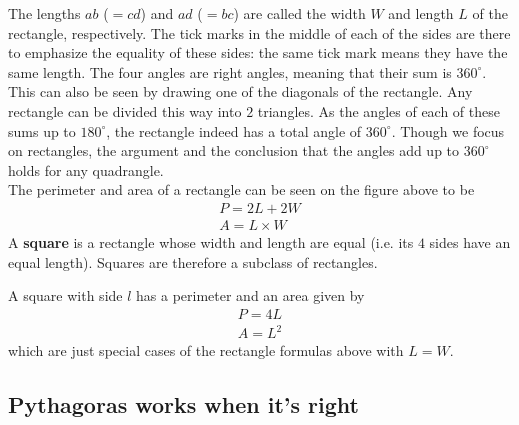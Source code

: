 \noindent The lengths $ab$ ($=cd$) and $ad$ ($=bc$) are called the width $W$ and length $L$ of the rectangle, respectively. The tick marks in the middle of each of the sides are there to emphasize the equality of these sides: the same tick mark means they have the same length. The four angles are right angles, meaning that their sum is $360^{\circ}$. This can also be seen by drawing one of the diagonals of the rectangle. Any rectangle can be divided this way into $2$ triangles. As the angles of each of these sums up to $180^{\circ}$, the rectangle indeed has a total angle of $360^{\circ}$. Though we focus on rectangles, the argument and the conclusion that the angles add up to $360^{\circ}$ holds for any quadrangle.\\

\noindent The perimeter and area of a rectangle can be seen on the figure above to be
\begin{eqnarray*}
P = 2 L + 2 W \\
A = L \times W
\end{eqnarray*}
\noindent A \textbf{square} is a rectangle whose width and length are equal (i.e. its $4$ sides have an equal length). Squares are therefore a subclass of rectangles. 
\begin{center}
\end{center}
\noindent A square with side $l$ has a perimeter and an area given by
\begin{eqnarray*}
P = 4 L \\
A = L^2
\end{eqnarray*}
\noindent which are just special cases of the rectangle formulas above with $L=W$.

\subsection{Pythagoras works when it's right}

